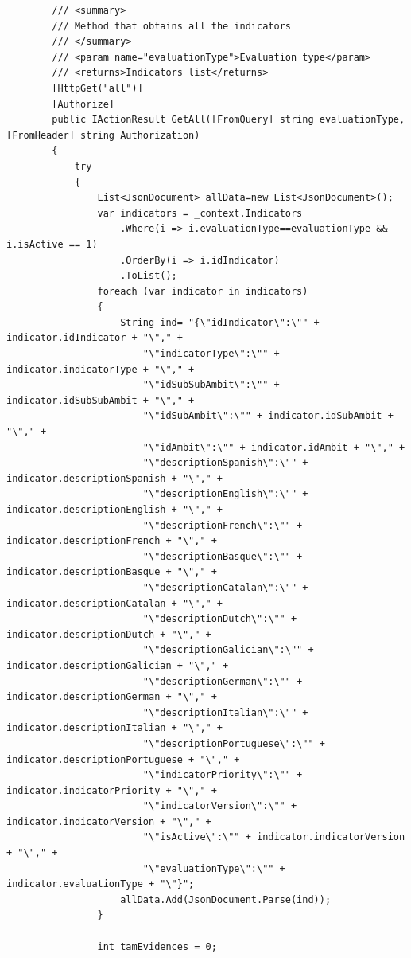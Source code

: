 \begin{itemize}
\begin{itemize}
\begin{lstlisting}
        /// <summary>
        /// Method that obtains all the indicators
        /// </summary>
        /// <param name="evaluationType">Evaluation type</param>
        /// <returns>Indicators list</returns>
        [HttpGet("all")]
        [Authorize]
        public IActionResult GetAll([FromQuery] string evaluationType, [FromHeader] string Authorization)
        {
            try
            {
                List<JsonDocument> allData=new List<JsonDocument>();
                var indicators = _context.Indicators
                    .Where(i => i.evaluationType==evaluationType && i.isActive == 1)
                    .OrderBy(i => i.idIndicator)
                    .ToList();
                foreach (var indicator in indicators)
                {                    
                    String ind= "{\"idIndicator\":\"" + indicator.idIndicator + "\"," +
                        "\"indicatorType\":\"" + indicator.indicatorType + "\"," +
                        "\"idSubSubAmbit\":\"" + indicator.idSubSubAmbit + "\"," +
                        "\"idSubAmbit\":\"" + indicator.idSubAmbit + "\"," +
                        "\"idAmbit\":\"" + indicator.idAmbit + "\"," +
                        "\"descriptionSpanish\":\"" + indicator.descriptionSpanish + "\"," +
                        "\"descriptionEnglish\":\"" + indicator.descriptionEnglish + "\"," +
                        "\"descriptionFrench\":\"" + indicator.descriptionFrench + "\"," +
                        "\"descriptionBasque\":\"" + indicator.descriptionBasque + "\"," +
                        "\"descriptionCatalan\":\"" + indicator.descriptionCatalan + "\"," +
                        "\"descriptionDutch\":\"" + indicator.descriptionDutch + "\"," +
                        "\"descriptionGalician\":\"" + indicator.descriptionGalician + "\"," +
                        "\"descriptionGerman\":\"" + indicator.descriptionGerman + "\"," +
                        "\"descriptionItalian\":\"" + indicator.descriptionItalian + "\"," +
                        "\"descriptionPortuguese\":\"" + indicator.descriptionPortuguese + "\"," +
                        "\"indicatorPriority\":\"" + indicator.indicatorPriority + "\"," +
                        "\"indicatorVersion\":\"" + indicator.indicatorVersion + "\"," +
                        "\"isActive\":\"" + indicator.indicatorVersion + "\"," +
                        "\"evaluationType\":\"" + indicator.evaluationType + "\"}";
                    allData.Add(JsonDocument.Parse(ind));
                }

                int tamEvidences = 0;


\end{lstlisting}
\end{itemize}
\end{itemize}
